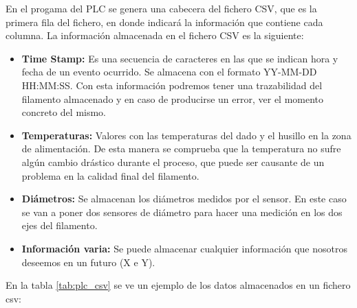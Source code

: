 En el progama del PLC se genera una cabecera del fichero CSV, que es la primera fila del fichero, en donde indicará la información que contiene cada columna. La información almacenada en el fichero CSV es la siguiente:

\begin{itemize}
    \item{\textbf{Time Stamp: }Es una secuencia de caracteres en las que se indican hora y fecha de un evento ocurrido. Se almacena con el formato YY-MM-DD HH:MM:SS. Con esta información podremos tener una trazabilidad del filamento almacenado y en caso de producirse un error, ver el momento concreto del mismo.}
    \item{\textbf{Temperaturas: }Valores con las temperaturas del dado y el husillo en la zona de alimentación. De esta manera se comprueba que la temperatura no sufre algún cambio drástico durante el proceso, que puede ser causante de un problema en la calidad final del filamento.}
    \item{\textbf{Diámetros: }Se almacenan los diámetros medidos por el sensor. En este caso se van a poner dos sensores de diámetro para hacer una medición en los dos ejes del filamento.}
    \item{\textbf{Información varia: }Se puede almacenar cualquier información que nosotros deseemos en un futuro (X e Y).}
\end{itemize}

En la tabla \ref{tab:plc_csv} se ve un ejemplo de los datos almacenados en un fichero csv:

